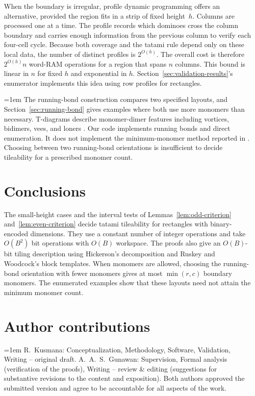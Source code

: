 \documentclass[11pt, reqno]{amsart}
\theoremstyle{definition}
\theoremstyle{remark}
\numberwithin{equation}{section}
\begin{document}
When the boundary is irregular, profile dynamic programming offers an
alternative, provided the region fits in a strip of fixed height~$h$.
Columns are processed one at a time. The profile records which
dominoes cross the column boundary and carries enough information from
the previous column to verify each four-cell cycle. Because both
coverage and the tatami rule depend only on these local data, the
number of distinct profiles is $2^{O(h)}$. The overall cost is
therefore $2^{O(h)}n$ word-RAM operations for a region that spans $n$
columns. This bound is linear in $n$ for fixed $h$ and exponential in $h$.
Section~\ref{sec:validation-results}'s enumerator implements this idea using row profiles for
rectangles.

    {\emergencystretch=1em
        The running-bond construction compares two specified layouts, and
        Section~\ref{sec:running-bond} gives examples where both use more monomers than necessary.
        T-diagrams describe monomer-dimer features including vortices, bidimers,
        vees, and loners \cite{erws11}. Our code implements running bonds and
        direct enumeration. It does not implement the minimum-monomer method
        reported in \cite[Section~4.2]{erws11}. Choosing between two running-bond
        orientations is insufficient to decide tileability for a prescribed
        monomer count.\par}

\section{Conclusions}
\label{sec:conclusions}

The small-height cases and the interval tests of
Lemmas~\ref{lem:odd-criterion} and~\ref{lem:even-criterion} decide
tatami tileability for rectangles with binary-encoded dimensions.
They use a constant number of integer operations and take
$O(B^2)$ bit operations with $O(B)$ workspace. The proofs also give
an $O(B)$-bit tiling description using
Hickerson's decomposition and Ruskey and Woodcock's block templates.
When monomers are allowed, choosing the running-bond orientation with
fewer monomers gives at most $\min(r,c)$ boundary monomers. The
enumerated examples show that these layouts need not attain the
minimum monomer count.

\section*{Author contributions}
{\emergencystretch=1em
    R.~Kusmana: Conceptualization, Methodology, Software, Validation,
    Writing -- original draft. A.~A.~S.~Gunawan: Supervision, Formal analysis
    (verification of the proofs), Writing -- review \& editing
    (suggestions for substantive revisions to the content and exposition).
    Both authors approved the submitted version and agree to be
    accountable for all aspects of the work.\par}
\end{document}
